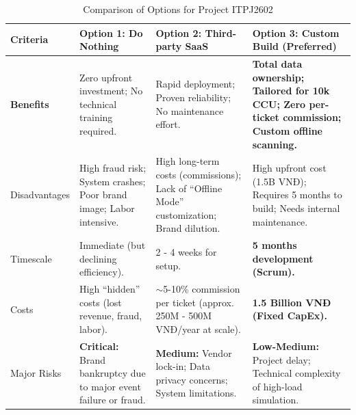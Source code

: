 \begin{table}[H]
\centering
\small
\renewcommand{\arraystretch}{1.5}
\begin{tabularx}{\textwidth}{|>{\cellcolor[HTML]{1F85B5}\color{white}\bfseries}p{2.5cm}|X|X|X|}
\hline
\rowcolor[HTML]{1F85B5} 
\color{white}Criteria & \color{white}Option 1: Do Nothing & \color{white}Option 2: Third-party SaaS & \color{white}Option 3: Custom Build (Preferred) \\ \hline

\rowcolor[HTML]{FFFFFF} 
Benefits & Zero upfront investment; No technical training required. & Rapid deployment; Proven reliability; No maintenance effort. & \textbf{Total data ownership; Tailored for 10k CCU; Zero per-ticket commission; Custom offline scanning.} \\ \hline

\rowcolor[HTML]{DAEEF3} 
Disadvantages & High fraud risk; System crashes; Poor brand image; Labor intensive. & High long-term costs (commissions); Lack of ``Offline Mode'' customization; Brand dilution. & High upfront cost (1.5B VNĐ); Requires 5 months to build; Needs internal maintenance. \\ \hline

\rowcolor[HTML]{FFFFFF} 
Timescale & Immediate (but declining efficiency). & 2 - 4 weeks for setup. & \textbf{5 months development (Scrum).} \\ \hline

\rowcolor[HTML]{DAEEF3} 
Costs & High ``hidden'' costs (lost revenue, fraud, labor). & $\sim$5-10\% commission per ticket (approx. 250M - 500M VNĐ/year at scale). & \textbf{1.5 Billion VNĐ (Fixed CapEx).} \\ \hline

\rowcolor[HTML]{FFFFFF} 
Major Risks & \textbf{Critical:} Brand bankruptcy due to major event failure or fraud. & \textbf{Medium:} Vendor lock-in; Data privacy concerns; System limitations. & \textbf{Low-Medium:} Project delay; Technical complexity of high-load simulation. \\ \hline
\end{tabularx}
\caption{Comparison of Options for Project ITPJ2602}
\end{table}